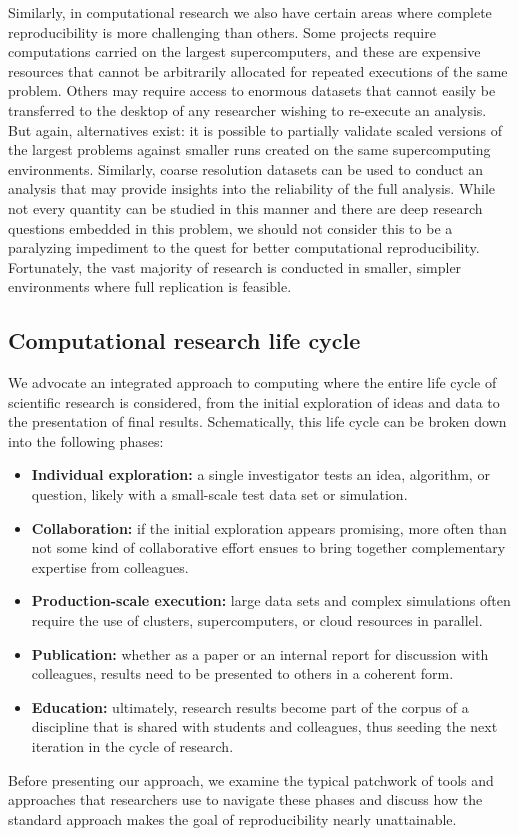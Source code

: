 \documentclass[ChapterTOCs,krantz2]{krantz} %
\begin{document}
Similarly, in computational research we also have certain areas where complete
reproducibility is more challenging than others. Some projects require
computations carried on the largest supercomputers, and these are expensive
resources that cannot be arbitrarily allocated for repeated executions of the
same problem. Others may require access to enormous datasets that cannot
easily be transferred to the desktop of any researcher wishing to re-execute an
analysis.  But again, alternatives exist: it is possible to partially validate
scaled versions of the largest problems against smaller runs created on the
same supercomputing environments.  Similarly, coarse resolution datasets can be
used to conduct an analysis that may provide insights into the reliability of
the full analysis.  While not every quantity can be studied in this manner and
there are deep research questions embedded in this problem, we should not
consider this to be a paralyzing impediment to the quest for better
computational reproducibility.  Fortunately, the vast majority of research is
conducted in smaller, simpler environments where full replication is feasible.

\subsection{Computational research life cycle}\label{subsec:lifecycle}

We advocate an integrated approach to computing where the entire
life cycle of scientific research is considered, from the initial exploration
of ideas and data to the presentation of final results.  Schematically, this
life cycle can be broken down into the following phases:

\begin{itemize}
\item \textbf{Individual exploration:} a single investigator tests an idea,
  algorithm, or question, likely with a small-scale test data set or simulation.
\item \textbf{Collaboration:} if the initial exploration appears promising,
  more often than not some kind of collaborative effort ensues to bring
  together complementary expertise from colleagues.
\item \textbf{Production-scale execution:} large data sets and complex
  simulations often require the use of clusters, supercomputers, or cloud
  resources in parallel.
\item \textbf{Publication:} whether as a paper or an internal report for
  discussion with colleagues, results need to be presented to others in a
  coherent form.
\item \textbf{Education:} ultimately, research results become part of the
  corpus of a discipline that is shared with students and colleagues, thus
  seeding the next iteration in the cycle of research.
\end{itemize}
Before presenting our approach, we examine the typical patchwork of tools and
approaches that researchers use to navigate these phases and discuss how the
standard approach makes the goal of reproducibility nearly unattainable.
\end{document}
